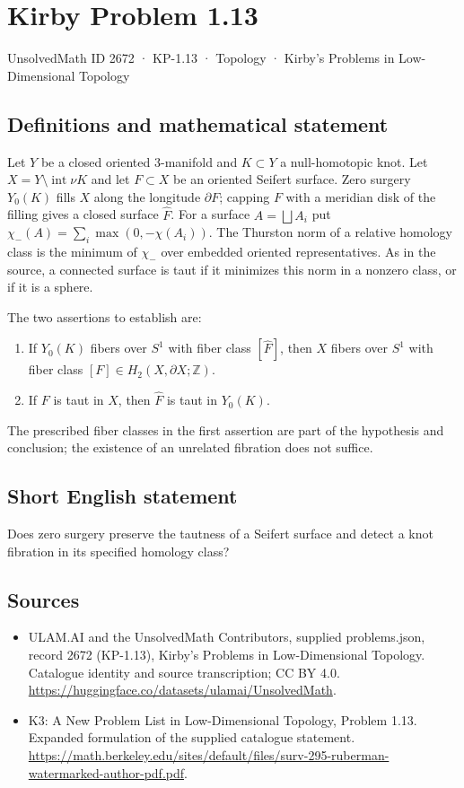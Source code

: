 \documentclass[11pt,a4paper]{article}
\begin{document}
\section*{Kirby Problem 1.13}\label{2672}
{\small UnsolvedMath ID 2672 · KP-1.13 · Topology · Kirby's Problems in Low-Dimensional Topology}
\subsection{Definitions and mathematical statement}
Let $Y$ be a closed oriented $3$-manifold and $K\subset Y$ a null-homotopic knot.
Let $X=Y\setminus\operatorname{int}\nu K$ and let $F\subset X$ be an oriented
Seifert surface. Zero surgery $Y_0(K)$ fills $X$ along the longitude $\partial F$;
capping $F$ with a meridian disk of the filling gives a closed surface $\widehat F$.
For a surface $A=\bigsqcup A_i$ put $\chi_-(A)=\sum_i\max(0,-\chi(A_i))$.
The Thurston norm of a relative homology class is the minimum of $\chi_-$ over
embedded oriented representatives. As in the source, a connected surface is taut
if it minimizes this norm in a nonzero class, or if it is a sphere.

The two assertions to establish are:
\begin{enumerate}
\item If $Y_0(K)$ fibers over $S^1$ with fiber class $[\widehat F]$, then $X$
fibers over $S^1$ with fiber class $[F]\in H_2(X,\partial X;\mathbb Z)$.
\item If $F$ is taut in $X$, then $\widehat F$ is taut in $Y_0(K)$.
\end{enumerate}
The prescribed fiber classes in the first assertion are part of the hypothesis
and conclusion; the existence of an unrelated fibration does not suffice.
\subsection{Short English statement}
Does zero surgery preserve the tautness of a Seifert surface and detect a knot fibration in its specified homology class?
\subsection{Sources}
\begin{itemize}
\item[S1] ULAM.AI and the UnsolvedMath Contributors, supplied problems.json, record 2672 (KP-1.13), Kirby's Problems in Low-Dimensional Topology. Catalogue identity and source transcription; CC BY 4.0.
\url{https://huggingface.co/datasets/ulamai/UnsolvedMath}.
\item[S2] K3: A New Problem List in Low-Dimensional Topology, Problem 1.13. Expanded formulation of the supplied catalogue statement.
\url{https://math.berkeley.edu/sites/default/files/surv-295-ruberman-watermarked-author-pdf.pdf}.
\end{itemize}
\end{document}
